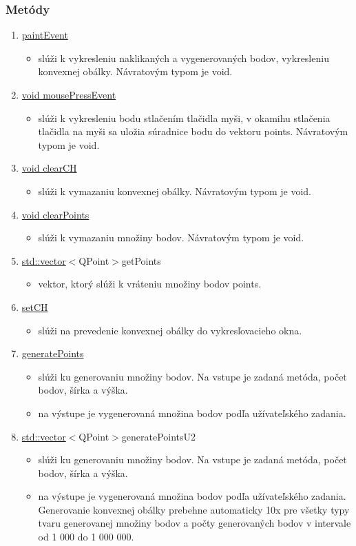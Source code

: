 \documentclass[12pt]{article}
\begin{document}
\subsubsection{Metódy}
\begin{enumerate}
\item[] \underline{paintEvent}
\begin{itemize}
\item slúži k vykresleniu naklikaných a vygenerovaných bodov, vykresleniu konvexnej obálky. Návratovým typom je void.
\end{itemize}
\item[] \underline{void mousePressEvent}
\begin{itemize}
\item slúži k vykresleniu bodu  stlačením tlačidla myši, v okamihu stlačenia tlačidla na myši sa uložia súradnice bodu do vektoru points. Návratovým typom je void.
\end{itemize}
\item[] \underline{void clearCH}
\begin{itemize}
\item slúži k vymazaniu konvexnej obálky. Návratovým typom je void.
\end{itemize}
\item[] \underline{void clearPoints}
\begin{itemize}
\item slúži k vymazaniu množiny bodov. Návratovým typom je void.
\end{itemize}
\item[] \underline {std::vector}$<${QPoint}$>${getPoints}
\begin{itemize}
\item vektor, ktorý slúži k vráteniu množiny bodov points.
\end{itemize}
\item[] \underline {setCH}
\begin{itemize}
\item slúži na prevedenie konvexnej obálky do vykresľovacieho okna.
\end{itemize}
\item[] \underline {generatePoints}
\begin{itemize}
\item slúži ku generovaniu množiny bodov. Na vstupe je zadaná metóda, počet bodov, šírka a výška.
\item na výstupe je vygenerovaná množina bodov podľa užívateľského zadania.
\end{itemize}
\item[] \underline {std::vector}$<${QPoint}$>${generatePointsU2}
\begin{itemize}
\item slúži ku generovaniu množiny bodov. Na vstupe je zadaná metóda, počet bodov, šírka a výška.
\item na výstupe je vygenerovaná množina bodov podľa užívateľského zadania. Generovanie konvexnej obálky prebehne automaticky 10x pre všetky typy tvaru generovanej množiny bodov a počty generovaných bodov v intervale od 1 000 do 1 000 000.
\end{itemize}
\end{enumerate}
\end{document}
